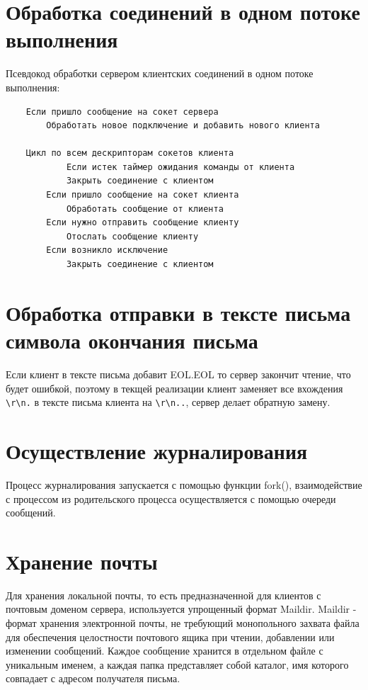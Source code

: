 \documentclass[a4paper,12pt]{report}
\begin{document}
\newpage


\section{Обработка соединений в одном потоке выполнения}

Псевдокод обработки сервером клиентских соединений в одном потоке выполнения:

\begin{verbatim}
    Если пришло сообщение на сокет сервера 
        Обработать новое подключение и добавить нового клиента
    
    Цикл по всем дескрипторам сокетов клиента
    	    Если истек таймер ожидания команды от клиента
            Закрыть соединение с клиентом
        Если пришло сообщение на сокет клиента
            Обработать сообщение от клиента
        Если нужно отправить сообщение клиенту
            Отослать сообщение клиенту
        Если возникло исключение
            Закрыть соединение с клиентом

\end{verbatim}

\section{Обработка отправки в тексте письма символа окончания письма}
Если клиент в тексте письма добавит EOL.EOL то сервер закончит чтение, что будет ошибкой, поэтому в текщей реализации клиент заменяет все вхождения \texttt{\textbackslash{}r\textbackslash{}n.} в тексте письма клиента на \texttt{\textbackslash{}r\textbackslash{}n..}, сервер делает обратную замену.

\section{Осуществление журналирования}

Процесс журналирования запускается с помощью функции fork(), взаимодействие с процессом из родительского процесса осуществляется с помощью очереди сообщений.

\section{Хранение почты}

Для хранения локальной почты, то есть предназначенной для клиентов с почтовым доменом сервера, используется упрощенный формат Maildir. Maildir - формат хранения электронной почты, не требующий монопольного захвата файла для обеспечения целостности почтового ящика при чтении, добавлении или изменении сообщений. Каждое сообщение хранится в отдельном файле с уникальным именем, а каждая папка представляет собой каталог, имя которого совпадает с адресом получателя письма. 
\end{document}
